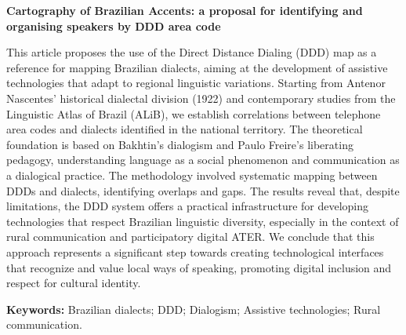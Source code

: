 	\begin{center}
		\textbf{\large Cartography of Brazilian Accents: a proposal for identifying and organising speakers by DDD area code}
	\end{center}	
	\begin{resumo}[Abstract] %
This article proposes the use of the Direct Distance Dialing (DDD) map as a reference for mapping Brazilian dialects, aiming at the development of assistive technologies that adapt to regional linguistic variations. Starting from Antenor Nascentes' historical dialectal division (1922) and contemporary studies from the Linguistic Atlas of Brazil (ALiB), we establish correlations between telephone area codes and dialects identified in the national territory. The theoretical foundation is based on Bakhtin's dialogism and
Paulo Freire's liberating pedagogy, understanding language as a social phenomenon and communication as a dialogical practice. The methodology involved systematic mapping between DDDs and dialects, identifying overlaps and gaps. The results reveal that, despite limitations, the DDD system offers a practical infrastructure for developing technologies that respect Brazilian linguistic diversity, especially in the context of rural communication and participatory digital ATER. We conclude that this approach represents a significant step towards creating technological interfaces that recognize and value local ways of speaking, promoting digital inclusion and respect for cultural identity.
\\[0.5em]

		
		\vspace*{0.5cm}
		
		\noindent\textbf{{Keywords: }} Brazilian dialects; DDD; Dialogism; Assistive technologies; Rural communication.
		
		
	\end{resumo}
	

	
	

	
